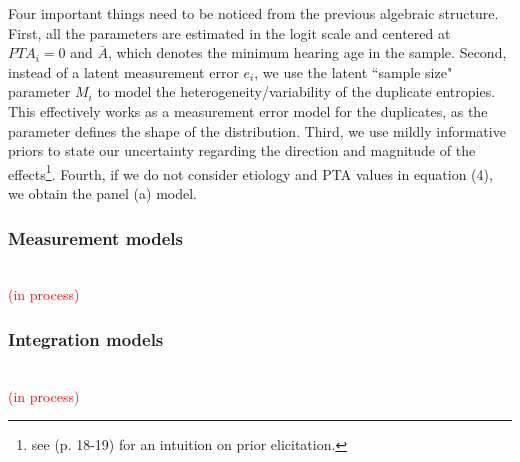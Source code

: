 Four important things need to be noticed from the previous algebraic structure. First, all the parameters are estimated in the logit scale and centered at $PTA_{i}=0$ and $\bar{A}$, which denotes the minimum hearing age in the sample. Second, instead of a latent measurement error $e_i$, we use the latent ``sample size" parameter $M_{i}$ to model the heterogeneity/variability of the duplicate entropies. This effectively works as a measurement error model for the duplicates, as the parameter defines the shape of the distribution. Third, we use mildly informative priors to state our uncertainty regarding the direction and magnitude of the effects\footnote{see \citet{Rivera_2021} (p. 18-19) for an intuition on prior elicitation.}. Fourth, if we do not consider etiology and PTA values in equation (4), we obtain the panel (a) model.
%
%
\subsubsection{Measurement models} \\
%
\textcolor{red}{(in process)}

\begin{comment}
	
	Identification of model:  
	soft identification (see \citet{Depaoli_2021}) 
	
	Considering the intelligibility of any stimulus is determined by three interrelated parties: the message, speaker, and listener, and that the inherent variability within each integrating part could be high, the current research assumes the utterances are equivalent among each other.
	
	It will consider the correlation with the entropy measure.
	\begin{enumerate}
		\item \textbf{Dichotomous CJ (CJ-D):} the Bradley-Terry-Luce model (BTL) \citep{Bradley_et_al_1952, Luce_1959}, used when the comparative judgments are dichotomous (CJ-D), 
		\item \textbf{Ordinal CJ (CJ-O):} the Generalized Bradley-Terry-Luce model BTL(k) \citep{Tutz_1986, Agresti_1992}, used when the comparative ordinal CJ (CJ-O).
		\item \textbf{Absolute (holistic) judgments (HJ):}
	\end{enumerate}
\end{comment}
%
%
\subsubsection{Integration models} \\
%
\textcolor{red}{(in process)} \\
%
%
